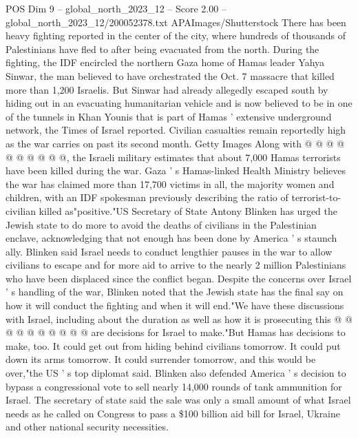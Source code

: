 \begin{textsample}{POS Dim 9 – global\_north\_2023\_12 – Score 2.00 – global\_north\_2023\_12/200052378.txt}
APAImages/Shutterstock There has been heavy fighting reported in the center of the city, where hundreds of thousands of Palestinians have fled to after being evacuated from the north.
During the fighting, the IDF encircled the northern Gaza home of Hamas leader Yahya Sinwar, the man believed to have orchestrated the Oct. 7 massacre that killed more than 1,200 Israelis.
But Sinwar had already allegedly escaped south by hiding out in an evacuating humanitarian vehicle and is now believed to be in one of the tunnels in Khan Younis that is part of Hamas ' extensive underground network, the Times of Israel reported.
Civilian casualties remain reportedly high as the war carries on past its second month.
Getty Images Along with @ @ @ @ @ @ @ @ @ @, the Israeli military estimates that about 7,000 Hamas terrorists have been killed during the war.
Gaza ' s Hamas-linked Health Ministry believes the war has claimed more than 17,700 victims in all, the majority women and children, with an IDF spokesman previously describing the ratio of terrorist-to-civilian killed as"positive."US Secretary of State Antony Blinken has urged the Jewish state to do more to avoid the deaths of civilians in the Palestinian enclave, acknowledging that not enough has been done by America ' s staunch ally.
Blinken said Israel needs to conduct lengthier pauses in the war to allow civilians to escape and for more aid to arrive to the nearly 2 million Palestinians who have been displaced since the conflict began.
Despite the concerns over Israel ' s handling of the war, Blinken noted that the Jewish state has the final say on how it will conduct the fighting and when it will end."We have these discussions with Israel, including about the duration as well as how it is prosecuting this @ @ @ @ @ @ @ @ @ @ are decisions for Israel to make."But Hamas has decisions to make, too.
It could get out from hiding behind civilians tomorrow.
It could put down its arms tomorrow.
It could surrender tomorrow, and this would be over,"the US ' s top diplomat said.
Blinken also defended America ' s decision to bypass a congressional vote to sell nearly 14,000 rounds of tank ammunition for Israel.
The secretary of state said the sale was only a small amount of what Israel needs as he called on Congress to pass a \$100 billion aid bill for Israel, Ukraine and other national security necessities.

\end{textsample}
